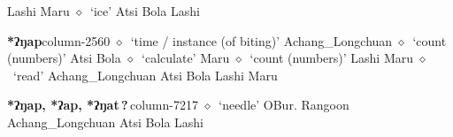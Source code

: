          Lashi 
\hspace{1ex}
         Maru 
\hspace{1ex}
         $\diamond$~`ice'
         Atsi 
\hspace{1ex}
         Bola 
\hspace{1ex}
         Lashi 
  \item {\footnotesize \textbf{*ʔŋap}}{\tiny column-2560}
         $\diamond$~`time / instance (of biting)'
         Achang\_Longchuan 
\hspace{1ex}
         $\diamond$~`count (numbers)'
         Atsi 
\hspace{1ex}
         Bola 
\hspace{1ex}
         $\diamond$~`calculate'
         Maru 
\hspace{1ex}
         $\diamond$~`count (numbers)'
         Lashi 
\hspace{1ex}
         Maru 
\hspace{1ex}
         $\diamond$~`read'
         Achang\_Longchuan 
\hspace{1ex}
         Atsi 
\hspace{1ex}
         Bola 
\hspace{1ex}
         Lashi 
\hspace{1ex}
         Maru 
  \item {\footnotesize \textbf{*ʔŋap, *ʔap, *ʔŋat\,?\,}}{\tiny column-7217}
         $\diamond$~`needle'
         OBur. 
\hspace{1ex}
         Rangoon 
\hspace{1ex}
         Achang\_Longchuan 
\hspace{1ex}
         Atsi 
\hspace{1ex}
         Bola 
\hspace{1ex}
         Lashi 
\hspace{1ex}
